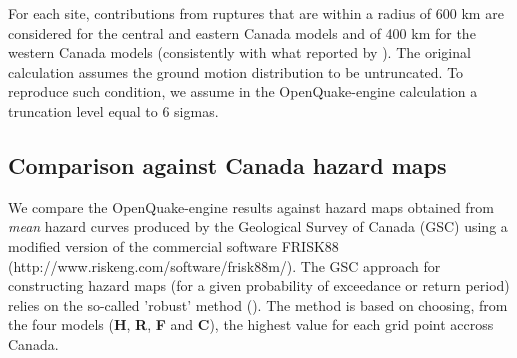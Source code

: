 For each site, contributions from ruptures that are within a radius of 600 km
are considered for the central and eastern Canada models and of 400 km for the
western Canada models (consistently with what reported by \cite{adams2003}). The
original calculation assumes the ground motion distribution to be untruncated.
To reproduce such condition, we assume in the OpenQuake-engine calculation a
truncation level equal to 6 sigmas.
%
\subsection{Comparison against Canada hazard maps}
We compare the OpenQuake-engine results against hazard maps obtained from
\textit{mean} hazard curves produced by the Geological Survey of Canada (GSC)
using a modified version of the commercial software FRISK88
(http://www.riskeng.com/software/frisk88m/). The GSC approach for constructing
hazard maps (for a given probability of exceedance or return period) relies on
the so-called 'robust' method (\cite{adams2003}). The method is based on
choosing, from the four models (\textbf{H}, \textbf{R}, \textbf{F} and
\textbf{C}), the highest value for each grid point accross Canada.

